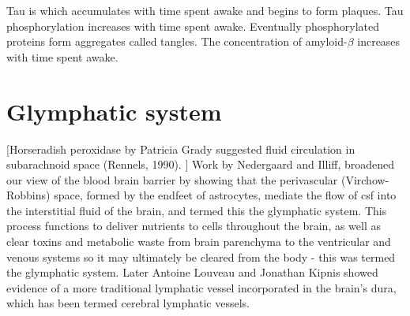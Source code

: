 Tau is   which accumulates with time spent awake and begins to form plaques. 
Tau phosphorylation increases with time spent awake. Eventually phosphorylated proteins form aggregates called tangles.
The concentration of amyloid-$\beta$ increases with time spent awake.
\section*{Glymphatic system}
[Horseradish peroxidase by Patricia Grady suggested fluid circulation in subarachnoid space (Rennels, 1990). ] Work by Nedergaard and Illiff, broadened our view of the blood brain barrier by showing that the perivascular (Virchow-Robbins) space, formed by the endfeet of astrocytes, mediate the flow of csf into the interstitial fluid of the brain, and termed this the glymphatic system. This process functions to deliver nutrients to cells throughout the brain, as well as clear toxins and metabolic waste from brain parenchyma to the ventricular and venous systems so it may ultimately be cleared from the body - this was termed the glymphatic system. Later Antoine Louveau and Jonathan Kipnis showed evidence of a more traditional lymphatic vessel incorporated in the brain’s dura, which has been termed cerebral lymphatic vessels.


